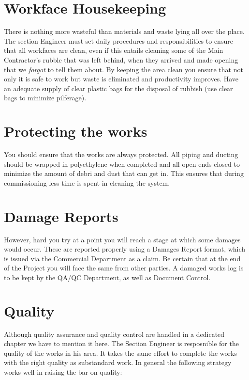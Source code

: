 \section*{Workface Housekeeping}

There is nothing more wasteful than materials and waste lying all over the
place. The section Engineer must set daily procedures and responsibilities
to ensure that all workfaces are clean, even if this entails cleaning
some of the Main Contractor's rubble that was left behind, when they arrived
and made opening that we \textit{forgot} to tell them about. By keeping the
area clean you ensure that not only it is safe to work but waste is
eliminated and productivity improves. Have an adequate supply of clear plastic
bags for the disposal of rubbish (use clear bags to minimize pilferage).


\section*{Protecting the works}
You should ensure that the works are always protected. All piping and ducting should be wrapped in polyethylene when completed and all open ends closed to minimize the amount of debri and dust that can get in. This ensures that
during commissioning less time is spent in cleaning the system. 


\section*{Damage Reports}

However, hard you try at a point you will reach a stage at which some damages
would occur. These are reported properly using a Damages Report format, which
is issued via the Commercial Department as a claim. Be certain that at the
end of the Project you will face the same from other parties. A damaged works
log is to be kept by the QA/QC Department, as well as Document Control.




\section*{Quality}

Although quality assurance and quality control are handled in a dedicated chapter
we have to mention it here. The Section Engineer is resposnible for the quality
of the works in his area. It takes the same effort to complete the works with the right quality as substandard work. In general the following strategy works
well in raising the bar on quality:


